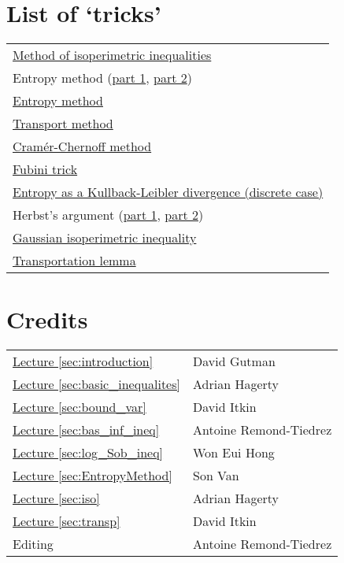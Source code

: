 \documentclass[reqno]{amsproc}
\newcommand{\fref}[2]{\hyperref[#2]{#1 \ref*{#2}}}
\begin{document}
\section*{List of `tricks'}
	\begin{tabular}{l}
		\hyperref[sec:method_of_isoperimetric_inequalities]{Method of isoperimetric inequalities}\\
		Entropy method (\hyperref[sec:entropy_method]{part 1}, \hyperref[rmk:entropy_method]{part 2})\\
		\hyperref[sec:entropy_method]{Entropy method}\\
		\hyperref[sec:transport_method]{Transport method}\\
		\hyperref[rmk:cramer_chernoff]{Cram\'{e}r-Chernoff method}\\
		\hyperref[rmk:Fubini]{Fubini trick}\\
		\hyperref[rmk:entropy_as_KL_divergence]{Entropy as a Kullback-Leibler divergence (discrete case)}\\
		Herbst's argument (\hyperref[rmk:herbst_1]{part 1}, \hyperref[rmk:herbst_2]{part 2})\\
		\hyperref[rmk:iso]{Gaussian isoperimetric inequality}\\
		\hyperref[lem:transp]{Transportation lemma}
	\end{tabular}
\section*{Credits}
	\begin{tabular}{ll}
		\fref{Lecture}{sec:introduction}& David Gutman\\
		\fref{Lecture}{sec:basic_inequalites}& Adrian Hagerty\\
		\fref{Lecture}{sec:bound_var}& David Itkin\\
		\fref{Lecture}{sec:bas_inf_ineq}& Antoine Remond-Tiedrez\\
		\fref{Lecture}{sec:log_Sob_ineq}& Won Eui Hong \\
		\fref{Lecture}{sec:EntropyMethod}& Son Van \\
		\fref{Lecture}{sec:iso}& Adrian Hagerty \\
		\fref{Lecture}{sec:transp} & David Itkin\\
		Editing& Antoine Remond-Tiedrez
	\end{tabular}



\end{document}
